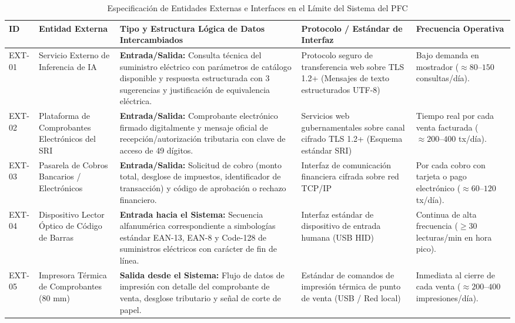 \begin{table}[htbp]
	\centering
	\scriptsize
	\caption{Especificación de Entidades Externas e Interfaces en el Límite del Sistema del PFC \cite{ieee29148, pohl2025}}
	\label{tab:entidades_externas}
	\begin{tabularx}{\textwidth}{l >{\raggedright\arraybackslash}p{} Y >{\raggedright\arraybackslash}p{0.18\textwidth} >{\raggedright\arraybackslash}p{0.18\textwidth}}
		\toprule
		\textbf{ID} & \textbf{Entidad Externa} & \textbf{Tipo y Estructura Lógica de Datos Intercambiados} & \textbf{Protocolo / Estándar de Interfaz} & \textbf{Frecuencia Operativa} \\
		\midrule
		EXT-01 & Servicio Externo de Inferencia de IA & \textbf{Entrada/Salida:} Consulta técnica del suministro eléctrico con parámetros de catálogo disponible y respuesta estructurada con 3 sugerencias y justificación de equivalencia eléctrica. & Protocolo seguro de transferencia web sobre TLS 1.2+ (Mensajes de texto estructurados UTF-8) & Bajo demanda en mostrador ($\approx 80\text{--}150$ consultas/día). \\
		\midrule
		EXT-02 & Plataforma de Comprobantes Electrónicos del SRI & \textbf{Entrada/Salida:} Comprobante electrónico firmado digitalmente y mensaje oficial de recepción/autorización tributaria con clave de acceso de 49 dígitos. & Servicios web gubernamentales sobre canal cifrado TLS 1.2+ (Esquema estándar SRI) & Tiempo real por cada venta facturada ($\approx 200\text{--}400$ tx/día). \\
		\midrule
		EXT-03 & Pasarela de Cobros Bancarios / Electrónicos & \textbf{Entrada/Salida:} Solicitud de cobro (monto total, desglose de impuestos, identificador de transacción) y código de aprobación o rechazo financiero. & Interfaz de comunicación financiera cifrada sobre red TCP/IP & Por cada cobro con tarjeta o pago electrónico ($\approx 60\text{--}120$ tx/día). \\
		\midrule
		EXT-04 & Dispositivo Lector Óptico de Código de Barras & \textbf{Entrada hacia el Sistema:} Secuencia alfanumérica correspondiente a simbologías estándar EAN-13, EAN-8 y Code-128 de suministros eléctricos con carácter de fin de línea. & Interfaz estándar de dispositivo de entrada humana (USB HID) & Continua de alta frecuencia ($\ge 30$ lecturas/min en hora pico). \\
		\midrule
		EXT-05 & Impresora Térmica de Comprobantes (80 mm) & \textbf{Salida desde el Sistema:} Flujo de datos de impresión con detalle del comprobante de venta, desglose tributario y señal de corte de papel. & Estándar de comandos de impresión térmica de punto de venta (USB / Red local) & Inmediata al cierre de cada venta ($\approx 200\text{--}400$ impresiones/día). \\
		\bottomrule
	\end{tabularx}
\end{table}
